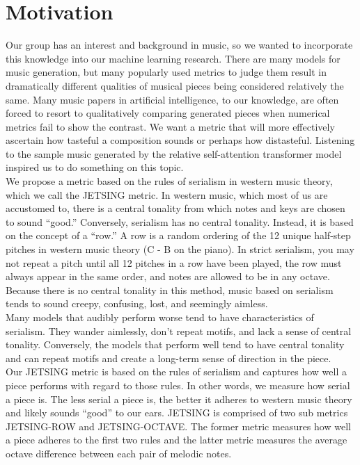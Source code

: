 \documentclass[11pt]{article}
\begin{document}
\section{Motivation}
Our group has an interest and background in music, so we wanted to incorporate this knowledge into our machine learning research. There are many models for music generation, but many popularly used metrics to judge them result in dramatically different qualities of musical pieces being considered relatively the same. Many music papers in artificial intelligence, to our knowledge, are often forced to resort to qualitatively comparing generated pieces when numerical metrics fail to show the contrast. We want a metric that will more effectively ascertain how tasteful a composition sounds or perhaps how distasteful. Listening to the sample music generated by the relative self-attention transformer model inspired us to do something on this topic.
\\ \indent We propose a metric based on the rules of serialism in western music theory, which we call the JETSING metric. In western music, which most of us are accustomed to, there is a central tonality from which notes and keys are chosen to sound “good.” Conversely, serialism has no central tonality. Instead, it is based on the concept of a “row.” A row is a random ordering of the 12 unique half-step pitches in western music theory (C - B on the piano). In strict serialism, you may not repeat a pitch until all 12 pitches in a row have been played, the row must always appear in the same order, and notes are allowed to be in any octave. Because there is no central tonality in this method, music based on serialism tends to sound creepy, confusing, lost, and seemingly aimless.
\\ \indent Many models that audibly perform worse tend to have characteristics of serialism. They wander aimlessly, don’t repeat motifs, and lack a sense of central tonality. Conversely, the models that perform well tend to have central tonality and can repeat motifs and create a long-term sense of direction in the piece.
\\ \indent Our JETSING metric is based on the rules of serialism and captures how well a piece performs with regard to those rules. In other words, we measure how serial a piece is. The less serial a piece is, the better it adheres to western music theory and likely sounds “good” to our ears. JETSING is comprised of two sub metrics JETSING-ROW and JETSING-OCTAVE. The former metric measures how well a piece adheres to the first two rules and the latter metric measures the average octave difference between each pair of melodic notes.
\end{document}
